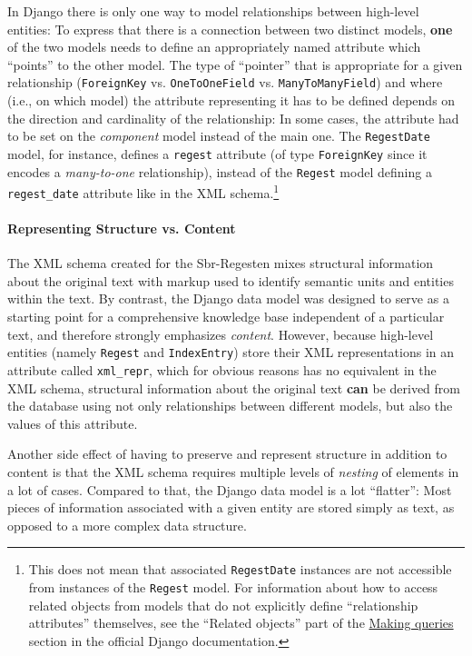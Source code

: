 In Django there is only one way to model relationships between
high-level entities: To express that there is a connection between two
distinct models, \textbf{one} of the two models needs to define an
appropriately named attribute which ``points'' to the other model. The
type of ``pointer'' that is appropriate for a given relationship
(\texttt{ForeignKey} vs. \texttt{OneToOneField} vs.
\texttt{ManyToManyField}) and where (i.e., on which model) the
attribute representing it has to be defined depends on the direction
and cardinality of the relationship: In some cases, the attribute had
to be set on the \emph{component} model instead of the main one. The
\texttt{RegestDate} model, for instance, defines a \texttt{regest}
attribute (of type \texttt{ForeignKey} since it encodes a
\emph{many-to-one} relationship), instead of the \texttt{Regest} model
defining a \texttt{regest\_date} attribute like in the XML
schema.\footnote{This does not mean that associated
  \texttt{RegestDate} instances are not accessible from instances of
  the \texttt{Regest} model. For information about how to access
  related objects from models that do not explicitly define
  ``relationship attributes'' themselves, see the ``Related objects''
  part of the
  \href{https://docs.djangoproject.com/en/1.4/topics/db/queries/}{Making
    queries} section in the official Django documentation.}

\paragraph{Representing Structure vs. Content}

The XML schema created for the Sbr-Regesten mixes structural
information about the original text with markup used to identify
semantic units and entities within the text. By contrast, the Django
data model was designed to serve as a starting point for a
comprehensive knowledge base independent of a particular text, and
therefore strongly emphasizes \emph{content}. However, because
high-level entities (namely \texttt{Regest} and \texttt{IndexEntry})
store their XML representations in an attribute called
\texttt{xml\_repr}, which for obvious reasons has no equivalent in the
XML schema, structural information about the original text
\textbf{can} be derived from the database using not only relationships
between different models, but also the values of this attribute.

Another side effect of having to preserve and represent structure in
addition to content is that the XML schema requires multiple levels of
\emph{nesting} of elements in a lot of cases. Compared to that, the
Django data model is a lot ``flatter'': Most pieces of information
associated with a given entity are stored simply as text, as opposed
to a more complex data structure.

